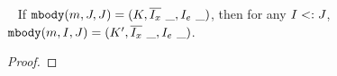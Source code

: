 \begin{lemma}~\label{lemma:mbody_type_preservation}
If $\mbody(m, J, J) = (K, \overline{I_x}\ \_, I_e\ \_)$, then for any $I <: J$, $\texttt{mbody}(m, I, J) = (K', \overline{I_x}\ \_, I_e\ \_)$.
\end{lemma}
\begin{proof}
	
\begin{comment}	
Since $\mbody(m, J, J)$ is defined, by \textsc{(T-Intf)} we derive that $\mbody(m, I, J)$ is also defined. Suppose that $$\mostSpecific(m, J, J) = \{I_0\}$$ $$\mostSpecificOverride(m, J, I_0) = \{K\}$$
$$\mostSpecific(m, I, J) = \{I'_0\}$$ $$\mostSpecificOverride(m, I, I'_0) = \{K'\}$$

Below we use $I[m\uparrow J]$ to denote the type of method $m$ defined in $I$ that overrides $J$. We have to prove that $K'[m\uparrow I'_0] = K[m\uparrow I_0]$.
Two facts:
\begin{itemize}
	\item A. By $\textsc{(T-Intf)}$, $\canOverride$ ensures that an override between any two original methods preserves the method type. Formally, $$I_1 \subtype I_2 \ \ \Rightarrow\ \ I_1[m\uparrow I_1] = I_2[m\uparrow I_2]$$
	\item B. By $\textsc{(T-Method)}$ and $\textsc{(T-AbsMethod)}$, any partial override also preserves method type. Formally,
	  $$I_1 \subtype I_2\ \ \Rightarrow\ \ I_1[m\uparrow I_2] = I_2[m\uparrow I_2]$$
\end{itemize}

By definition of $\mostSpecificOverride$, $K \subtype I_0, K' \subtype I'_0$. By Fact B, $$K[m\uparrow I_0] = I_0[m\uparrow I_0] \quad K'[m\uparrow I'_0] = I'_0[m\uparrow I'_0]$$

Hence it suffices to prove that $I'_0[m\uparrow I'_0] = I_0[m\uparrow I_0]$. Actually when calculating $\mostSpecific(m, J, J)$, by the definition of $\mostSpecific$ we know that $I_0 \subtype J$ and $I_0[m \; \kwoverride \; I_0]$ is defined. So when calculating $\mostSpecific(m, I, J)$ with $I \subtype J$, $I_0$ should also appear in the set before pruned, since the conditions are again satisfied. But after pruning, only $I'_0$ is obtained, by definition of $\prune$ it implies $I'_0 \subtype I_0$. By Fact A, the proof is done.
\end{comment}

\end{proof}


